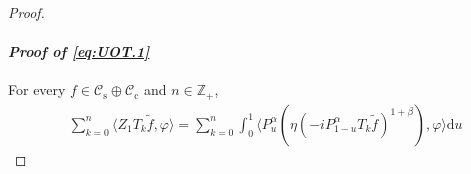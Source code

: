\documentclass[12pt,a4paper]{amsart}
\theoremstyle{plain}
\theoremstyle{definition}
\numberwithin{equation}{section}
\begin{document}
\begin{proof}
\paragraph*{\it Proof of \eqref{eq:UOT.1}} 
For every $f\in \mathcal C_\mathrm s  \oplus \mathcal C_\mathrm c$ and $n\in \mathbb Z_+$,
 \begin{align}
  & \sum_{k=0}^n \langle Z_1 T_{k} \tilde f, \varphi \rangle
  = \sum_{k=0}^n \int_0^1 \langle P_u^\alpha (\eta(-iP_{1 - u}^\alpha T_k \tilde f)^{1+\beta}), \varphi\rangle \mathrm du

\end{align}
\end{proof}
\end{document}
